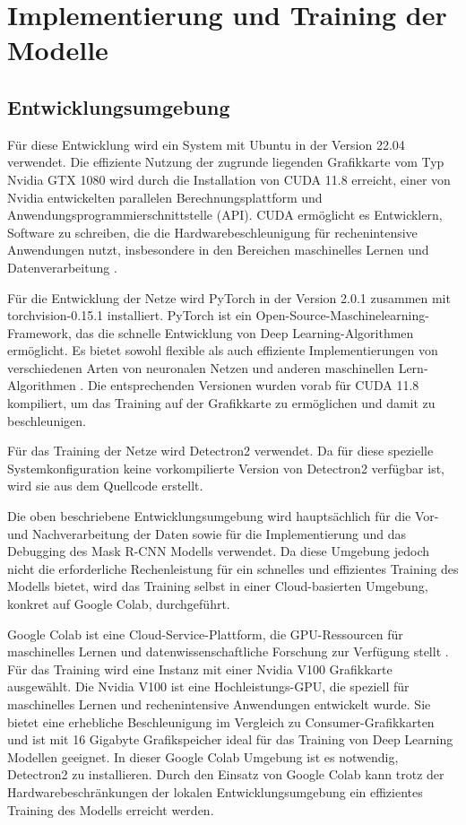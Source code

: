 \clearpage
\section{Implementierung und Training der Modelle}
\subsection{Entwicklungsumgebung}
Für diese Entwicklung wird ein System mit Ubuntu in der Version 22.04 verwendet. Die effiziente Nutzung der zugrunde liegenden Grafikkarte vom Typ \glqq Nvidia GTX 1080\grqq{} wird durch die Installation von CUDA 11.8 erreicht, einer von Nvidia entwickelten parallelen Berechnungsplattform und Anwendungsprogrammierschnittstelle (API). CUDA ermöglicht es Entwicklern, Software zu schreiben, die die Hardwarebeschleunigung für rechenintensive Anwendungen nutzt, insbesondere in den Bereichen maschinelles Lernen und Datenverarbeitung \cite{cuda}.

Für die Entwicklung der Netze wird PyTorch in der Version 2.0.1 zusammen mit torchvision-0.15.1 installiert. PyTorch ist ein Open-Source-Maschinelearning-Framework, das die schnelle Entwicklung von Deep Learning-Algorithmen ermöglicht. Es bietet sowohl flexible als auch effiziente Implementierungen von verschiedenen Arten von neuronalen Netzen und anderen maschinellen Lern-Algorithmen \cite{NEURIPS2019_9015}. Die entsprechenden Versionen wurden vorab für CUDA 11.8 kompiliert, um das Training auf der Grafikkarte zu ermöglichen und damit zu beschleunigen.

Für das Training der Netze wird Detectron2 verwendet. Da für diese spezielle Systemkonfiguration keine vorkompilierte Version von Detectron2 verfügbar ist, wird sie aus dem Quellcode erstellt.

Die oben beschriebene Entwicklungsumgebung wird hauptsächlich für die Vor- und Nachverarbeitung der Daten sowie für die Implementierung und das Debugging des Mask R-CNN Modells verwendet. Da diese Umgebung jedoch nicht die erforderliche Rechenleistung für ein schnelles und effizientes Training des Modells bietet, wird das Training selbst in einer Cloud-basierten Umgebung, konkret auf Google Colab, durchgeführt.

Google Colab ist eine Cloud-Service-Plattform, die GPU-Ressourcen für maschinelles Lernen und datenwissenschaftliche Forschung zur Verfügung stellt \cite{google-colab}.
Für das Training wird eine Instanz mit einer Nvidia V100 Grafikkarte ausgewählt. Die Nvidia V100 ist eine Hochleistungs-GPU, die speziell für maschinelles Lernen und rechenintensive Anwendungen entwickelt wurde. Sie bietet eine erhebliche Beschleunigung im Vergleich zu Consumer-Grafikkarten und ist mit 16 Gigabyte Grafikspeicher ideal für das Training von Deep Learning Modellen geeignet.
In dieser Google Colab Umgebung ist es notwendig, Detectron2 zu installieren. Durch den Einsatz von Google Colab kann trotz der Hardwarebeschränkungen der lokalen Entwicklungsumgebung ein effizientes Training des Modells erreicht werden.

